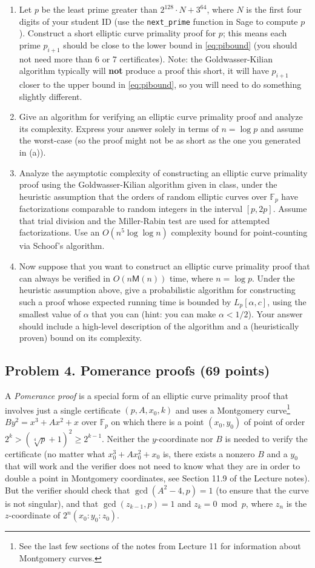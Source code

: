 \documentclass[11pt]{article}
\newcommand{\Fp}{\mathbb{F}_p}
\newcommand{\M}{\textsf{M}}
\theoremstyle{definition}
\begin{document}
\begin{enumerate}[{\bf (a)}]
\item
Let $p$ be the least prime greater than $2^{128}\cdot N+3^{64}$, where $N$ is the first four digits of your student ID (use the \texttt{next\_prime} function in Sage to compute $p$).
Construct a short elliptic curve primality proof for $p$; this means each prime $p_{i+1}$ should be close to the lower bound in \eqref{eq:pibound} (you should not need more than 6 or 7 certificates).
Note: the Goldwasser-Kilian algorithm typically will \textbf{not} produce a proof this short, it will have $p_{i+1}$ closer to the upper bound in \eqref{eq:pibound}, so you will need to do something slightly different.
\item
Give an algorithm for verifying an elliptic curve primality proof and analyze its complexity.  Express your answer solely in terms of $n=\log p$ and assume the worst-case (so the proof might not be as short as the one you generated in (a)).
\item
Analyze the asymptotic complexity of constructing an elliptic curve primality proof using the Goldwasser-Kilian algorithm given in class, under the heuristic assumption that the orders of random elliptic curves over $\Fp$ have factorizations comparable to random integers in the interval $[p,2p]$.  Assume that trial division and the Miller-Rabin test are used for attempted factorizations.
Use an $O(n^5\log\log n)$ complexity bound for point-counting via Schoof's algorithm.
\item
Now suppose that you want to construct an elliptic curve primality proof that can always be verified in $O(n\M(n))$ time, where $n=\log p$.
Under the heuristic assumption above, give a probabilistic algorithm for constructing such a proof whose expected running time is bounded by $L_p[\alpha,c]$, using the smallest value of $\alpha$ that you can (hint: you can make $\alpha < 1/2$).
Your answer should include a high-level description of the algorithm and a (heuristically proven) bound on its complexity.
\end{enumerate}

\subsection*{Problem 4. Pomerance proofs (69 points)}
A \emph{Pomerance proof} is a special form of an elliptic curve primality proof that involves just a single certificate $(p,A,x_0,k)$ and uses a Montgomery curve\footnote{See the last few sections of the notes from Lecture 11 for information about Montgomery curves.} $By^2=x^3+Ax^2+x$ over $\Fp$ on which there is a point $(x_0,y_0)$ of point of order $2^k > (\sqrt[4]{p}+1)^2 \ge 2^{k-1}$.  Neither the $y$-coordinate nor $B$ is needed to verify the certificate (no matter what $x_0^3+Ax_0^2+x_0$ is, there exists a nonzero $B$ and a $y_0$ that will work and the verifier does not need to know what they are in order to double a point in Montgomery coordinates, see Section 11.9 of the Lecture notes).  But the verifier should check that $\gcd(A^2-4,p)=1$ (to ensure that the curve is not singular), and that $\gcd(z_{k-1},p)=1$ and $z_k=0\bmod p$, where $z_n$ is the $z$-coordinate of $2^n(x_0:y_0:z_0)$.
\end{document}
